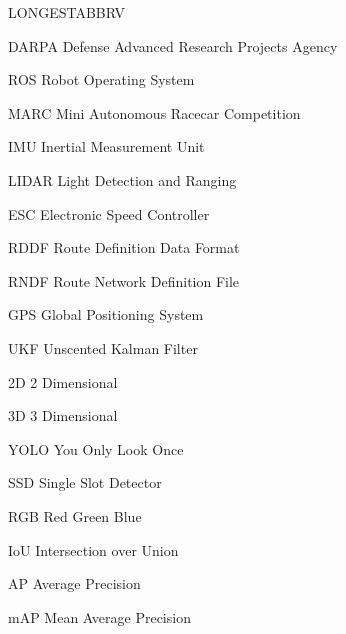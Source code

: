 \begin{theglossary}{LONGESTABBRV}

\item[DARPA] Defense Advanced Research Projects Agency
\item[ROS] Robot Operating System
\item[MARC] Mini Autonomous Racecar Competition
\item[IMU] Inertial Measurement Unit
\item[LIDAR] Light Detection and Ranging
\item[ESC] Electronic Speed Controller
\item[RDDF] Route Definition Data Format
\item[RNDF] Route Network Definition File
\item[GPS] Global Positioning System
\item[UKF] Unscented Kalman Filter
\item[2D] 2 Dimensional
\item[3D] 3 Dimensional
\item[YOLO] You Only Look Once
\item[SSD] Single Slot Detector
\item[RGB] Red Green Blue
\item[IoU] Intersection over Union
\item{AP} Average Precision
\item{mAP} Mean Average Precision

\end{theglossary}
